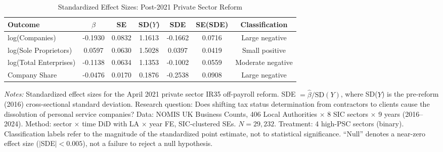 \begin{table}[htbp]
\centering
\caption{Standardized Effect Sizes: Post-2021 Private Sector Reform}
\label{tab:sde}
\begin{threeparttable}
\begin{tabular}{lcccccc}
\toprule
Outcome & $\hat{\beta}$ & SE & SD($Y$) & SDE & SE(SDE) & Classification \\
\midrule
log(Companies) & -0.1930 & 0.0832 & 1.1613 & -0.1662 & 0.0716 & Large negative \\
log(Sole Proprietors) & 0.0597 & 0.0630 & 1.5028 & 0.0397 & 0.0419 & Small positive \\
log(Total Enterprises) & -0.1138 & 0.0634 & 1.1353 & -0.1002 & 0.0559 & Moderate negative \\
Company Share & -0.0476 & 0.0170 & 0.1876 & -0.2538 & 0.0908 & Large negative \\
\bottomrule
\end{tabular}
\begin{tablenotes}[flushleft]
\small
\item \textit{Notes:} Standardized effect sizes for the April 2021 private sector IR35 off-payroll reform. SDE $= \hat{\beta} / \text{SD}(Y)$, where SD($Y$) is the pre-reform (2016) cross-sectional standard deviation. Research question: Does shifting tax status determination from contractors to clients cause the dissolution of personal service companies? Data: NOMIS UK Business Counts, 406 Local Authorities $\times$ 8 SIC sectors $\times$ 9 years (2016--2024). Method: sector $\times$ time DiD with LA $\times$ year FE, SIC-clustered SEs. $N = 29{,}232$. Treatment: 4 high-PSC sectors (binary). Classification labels refer to the magnitude of the standardized point estimate, not to statistical significance. ``Null'' denotes a near-zero effect size ($|$SDE$| < 0.005$), not a failure to reject a null hypothesis.
\end{tablenotes}
\end{threeparttable}
\end{table}
